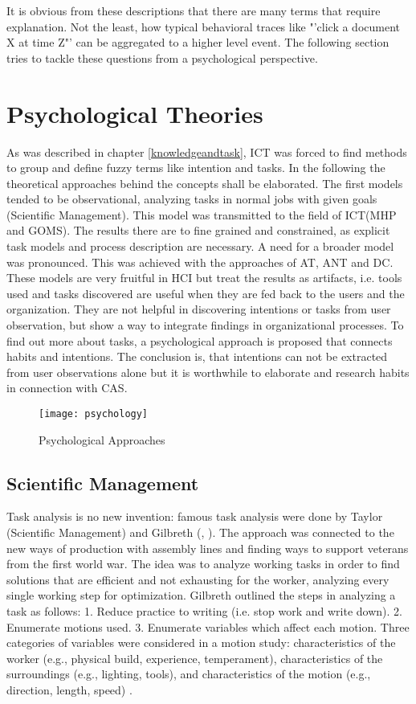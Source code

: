 It is obvious from these descriptions that there are many terms that require explanation. Not the least, how typical behavioral traces like "'click a document X at time Z"' can be aggregated to a higher level event. The following section tries to tackle these questions from a psychological perspective. 

\section{Psychological Theories}
As was described in chapter \ref{knowledgeandtask}, \acs{ICT} was forced to find methods to group and define fuzzy terms like intention and tasks. In the following the theoretical approaches behind the concepts shall be elaborated. The first models tended to be observational, analyzing tasks in normal jobs with given goals (Scientific Management). This model was transmitted to the field of \acs{ICT}(MHP and GOMS). The results there are to fine grained and constrained, as explicit task models and process description are necessary. A need for a broader model was pronounced. This was achieved with the approaches of \ac{AT}, \ac{ANT} and \ac{DC}. These models are very fruitful in \ac{HCI} but treat the results as artifacts, i.e. tools used and tasks discovered are useful when they are fed back to the users and the organization. They are not helpful in discovering intentions or tasks from user observation, but show a way to integrate findings in organizational processes. To find out more about tasks,  a psychological approach is proposed that connects habits and intentions. The conclusion is, that intentions can not be extracted from user observations alone but it is worthwhile to elaborate and research habits in connection with \ac{CAS}.

\begin{figure}[ht]
	\centering
  \texttt{[image: psychology]}
	\caption{Psychological Approaches}
	\label{fig5}
\end{figure}


\subsection{Scientific Management}
Task analysis is no new invention: famous task analysis were done by Taylor (Scientific Management) and Gilbreth (\cite{taylor2013scientific}, \cite{gilbreth1911motion}). The approach was connected to the new ways of production with assembly lines and finding ways to support veterans from the first world war. The idea was to analyze working tasks in order to find solutions that are efficient and not exhausting for the worker, analyzing every single working step for optimization. Gilbreth outlined the steps in analyzing a task as follows: 1. Reduce practice to writing (i.e. stop work and write down). 2. Enumerate motions used. 3. Enumerate variables which affect each motion. Three categories of variables were considered in a motion study: characteristics of the worker (e.g., physical build, experience, temperament), characteristics of the surroundings (e.g., lighting, tools), and characteristics of the motion (e.g., direction, length, speed) \cite{creighton1992origin}.

